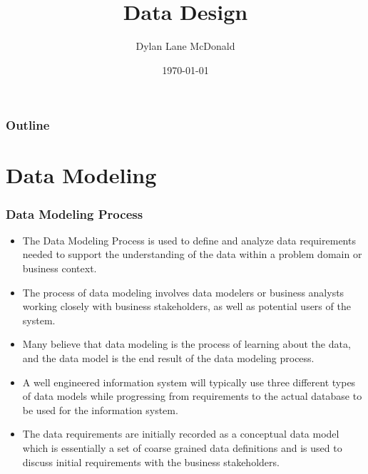 \documentclass[aspectratio=169]{beamer}
\title{Data Design}
\author{Dylan Lane McDonald}
\institute{CNM STEMulus Center\\Web Development with PHP}
\date{\today}
\begin{document}
\begin{frame}
\titlepage
\end{frame}

\begin{frame}
\frametitle{Outline}
\tableofcontents
\end{frame}

\section{Data Modeling}
\begin{frame}
\frametitle{Data Modeling Process}
\begin{itemize}
	\item The Data Modeling Process is used to define and analyze data requirements needed to support the understanding of the data within a problem domain or business context.
	\item The process of data modeling involves data modelers or business analysts working closely with business stakeholders, as well as potential users of the system.
	\item Many believe that data modeling is the process of learning about the data, and the data model is the end result of the data modeling process.
	\item A well engineered information system will typically use three different types of data models while progressing from requirements to the actual database to be used for the information system.
	\item The data requirements are initially recorded as a conceptual data model which is essentially a set of coarse grained data definitions and is used to discuss initial requirements with the business stakeholders.
\end{itemize}
\end{frame}
\end{document}
